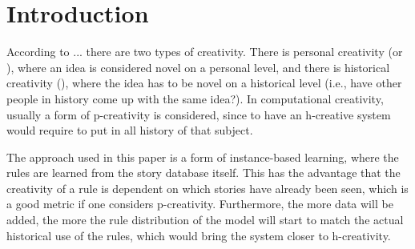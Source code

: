 \section{Introduction}
According to ... %
there are two types of creativity. There is personal creativity (or
), where an idea is considered novel on a personal level, and
there is historical creativity (), where the idea has to be
novel on a historical level (i.e., have other people in history come up with the
same idea?).
In computational creativity, usually a form of p-creativity is considered, since
to have an h-creative system would require to put in all history of that
subject.

The approach used in this paper is a form of instance-based learning, where the
rules are learned from the story database itself. This has the advantage that
the creativity of a rule is dependent on which stories have already been seen,
which is a good metric if one considers p-creativity. Furthermore, the more data
will be added, the more the rule distribution of the model will start to match 
the actual historical use of the rules, which would bring the system closer to
h-creativity.
